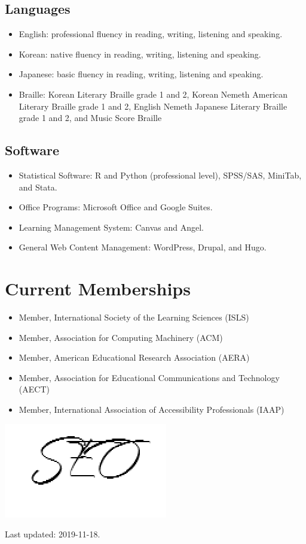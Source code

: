 \documentclass[11pt,a4paper,]{moderncv}
\providecommand{\tightlist}{%
	\setlength{\itemsep}{0pt}\setlength{\parskip}{0pt}}
\begin{document}
\hypertarget{languages}{%
\subsection{Languages}\label{languages}}

\begin{itemize}
\tightlist
\item
  English: professional fluency in reading, writing, listening and speaking.
\item
  Korean: native fluency in reading, writing, listening and speaking.
\item
  Japanese: basic fluency in reading, writing, listening and speaking.
\item
  Braille: Korean Literary Braille grade 1 and 2, Korean Nemeth American Literary Braille grade 1 and 2, English Nemeth Japanese Literary Braille grade 1 and 2, and Music Score Braille
\end{itemize}

\hypertarget{software}{%
\subsection{Software}\label{software}}

\begin{itemize}
\tightlist
\item
  Statistical Software: R and Python (professional level), SPSS/SAS, MiniTab, and Stata.
\item
  Office Programs: Microsoft Office and Google Suites.
\item
  Learning Management System: Canvas and Angel.
\item
  General Web Content Management: WordPress, Drupal, and Hugo.
\end{itemize}

\hypertarget{current-memberships}{%
\section{Current Memberships}\label{current-memberships}}

\begin{itemize}
\tightlist
\item
  Member, International Society of the Learning Sciences (ISLS)
\item
  Member, Association for Computing Machinery (ACM)
\item
  Member, American Educational Research Association (AERA)
\item
  Member, Association for Educational Communications and Technology (AECT)
\item
  Member, International Association of Accessibility Professionals (IAAP)
\end{itemize}

\includegraphics{"data/Signature.png"}

Last updated: 2019-11-18.
\end{document}
